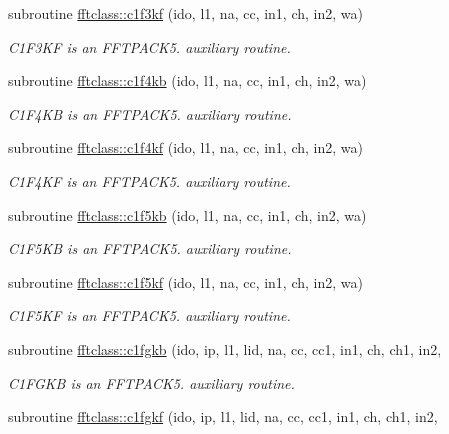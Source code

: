 \begin{DoxyCompactItemize}
subroutine \mbox{\hyperlink{namespacefftclass_ae586c2f39848274e0454c7d161522c31}{fftclass\+::c1f3kf}} (ido, l1, na, cc, in1, ch, in2, wa)
\begin{DoxyCompactList}\small\item\em C1\+F3\+KF is an F\+F\+T\+P\+A\+C\+K5. auxiliary routine. \end{DoxyCompactList}\item 
subroutine \mbox{\hyperlink{namespacefftclass_a16b67c4056cd4bef03d70d6289f60954}{fftclass\+::c1f4kb}} (ido, l1, na, cc, in1, ch, in2, wa)
\begin{DoxyCompactList}\small\item\em C1\+F4\+KB is an F\+F\+T\+P\+A\+C\+K5. auxiliary routine. \end{DoxyCompactList}\item 
subroutine \mbox{\hyperlink{namespacefftclass_a4121c0b7de23d7df058852fb75a9a31a}{fftclass\+::c1f4kf}} (ido, l1, na, cc, in1, ch, in2, wa)
\begin{DoxyCompactList}\small\item\em C1\+F4\+KF is an F\+F\+T\+P\+A\+C\+K5. auxiliary routine. \end{DoxyCompactList}\item 
subroutine \mbox{\hyperlink{namespacefftclass_aa356856107611ad66966fed70ede74f1}{fftclass\+::c1f5kb}} (ido, l1, na, cc, in1, ch, in2, wa)
\begin{DoxyCompactList}\small\item\em C1\+F5\+KB is an F\+F\+T\+P\+A\+C\+K5. auxiliary routine. \end{DoxyCompactList}\item 
subroutine \mbox{\hyperlink{namespacefftclass_a21d2647f4c2392ed5498288f99a3203c}{fftclass\+::c1f5kf}} (ido, l1, na, cc, in1, ch, in2, wa)
\begin{DoxyCompactList}\small\item\em C1\+F5\+KF is an F\+F\+T\+P\+A\+C\+K5. auxiliary routine. \end{DoxyCompactList}\item 
subroutine \mbox{\hyperlink{namespacefftclass_ac9b19ae24fcc92a08a29696cf60fd412}{fftclass\+::c1fgkb}} (ido, ip, l1, lid, na, cc, cc1, in1, ch, ch1, in2,
\begin{DoxyCompactList}\small\item\em C1\+F\+G\+KB is an F\+F\+T\+P\+A\+C\+K5. auxiliary routine. \end{DoxyCompactList}\item 
subroutine \mbox{\hyperlink{namespacefftclass_ac6d6749fee5ff8e325bdf80834fa5337}{fftclass\+::c1fgkf}} (ido, ip, l1, lid, na, cc, cc1, in1, ch, ch1, in2,

\end{DoxyCompactItemize}
